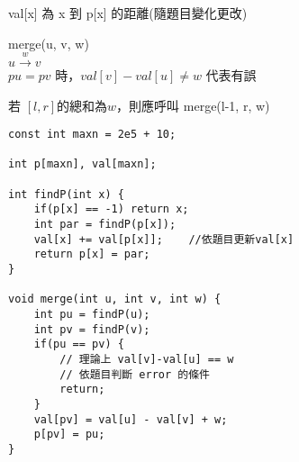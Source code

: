 \begin{description}
    \item val[x] 為 x 到 p[x] 的距離(隨題目變化更改)
    \item merge(u, v, w) \\
        $u \stackrel{w}{\longrightarrow} v$ \\
        $pu=pv$ 時，$val[v]-val[u] \ne w$ 代表有誤
    \item 若 $[l, r]$的總和為$w$，則應呼叫 merge(l-1, r, w)
\end{description}

\begin{lstlisting}
const int maxn = 2e5 + 10;

int p[maxn], val[maxn]; 

int findP(int x) {
    if(p[x] == -1) return x;
    int par = findP(p[x]);
    val[x] += val[p[x]];    //依題目更新val[x]
    return p[x] = par;
}

void merge(int u, int v, int w) {
    int pu = findP(u);
    int pv = findP(v);
    if(pu == pv) {
        // 理論上 val[v]-val[u] == w 
        // 依題目判斷 error 的條件
        return;
    }
    val[pv] = val[u] - val[v] + w;
    p[pv] = pu;
}
\end{lstlisting}